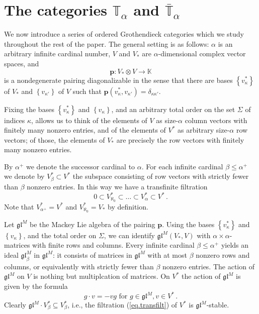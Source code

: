 \documentclass[11pt]{article}
\theoremstyle{plain}
\theoremstyle{nonumberplain}
\theoremstyle{plain}
\theoremstyle{nonumberplain}
\newcommand\bK{\mathbb K}
\newcommand\bT{\mathbb T}
\newcommand\fgl{\mathfrak{gl}}
\begin{document}
\section{The categories $\bT_\alpha$ and $\bar{\bT}_\alpha$}\label{se.ta} 



We now introduce a series of ordered Grothendieck categories which we
study throughout the rest of {the} paper. The general setting is as
follows: $\alpha$ is an arbitrary infinite cardinal number, $V$ and $V_*$ are
$\alpha$-dimensional complex vector spaces, and
\begin{equation*}
  \mathbf{p} :V_*\otimes V\to \bK
\end{equation*}
is a nondegenerate pairing diagonalizable in the sense that there are bases
$\left\{v^*_\kappa\right\}$ of $V_*$ and $\left\{v_{\kappa'}\right\}$ of $V$ such that $\mathbf{p}\left(v_\kappa^*,v_{\kappa'}\right)=\delta_{\kappa\kappa'}$.

Fixing the bases $\left\{v^*_\kappa\right\}$ and $\left\{v_\kappa\right\}$, and an arbitrary total order on the set $\Sigma$ of indices $\kappa$, allows us to think of the elements of $V$ as size-$\alpha$ column vectors with
finitely many nonzero entries, and of the {elements} of $V^*$
as arbitrary size-$\alpha$ row vectors; of those, the elements of
$V_*$ are precisely the row vectors with finitely many nonzero
entries.  

{By $\alpha^+$ we denote the successor cardinal
  to $\alpha$.}  For each infinite cardinal $\beta\le \alpha^+$ we denote by
$V^*_\beta\subset V^*$ the subspace consisting of row vectors with
strictly fewer than $\beta$ nonzero entries.   In this way we have a transfinite filtration
\begin{equation}
0\subset V^*_{\aleph_0}\subset \ldots \subset V^*_\alpha \subset V^*\,.
\label{eq.transfilt}\end{equation}
Note that $V^*_{\alpha^+}=V^*$ and $V^*_{\aleph_0}=V_*$ by definition. 

Let $\fgl^M$ be the Mackey Lie algebra of the pairing
$\mathbf{p}$.  Using the bases $\left\{v^*_\kappa\right\}$ and $\left\{v_\kappa\right\}$, and the total order on $\Sigma$, we can identify $\fgl^M(V_*,V)$ with $\alpha\times\alpha$-matrices with finite rows and columns.   Every infinite cardinal $\beta\leq\alpha^+$ yields an ideal $\fgl^M_\beta$ in $\fgl^M$: it consists of matrices  in $\fgl^M$ with at most $\beta$ nonzero rows and columns, or equivalently with strictly fewer than $\beta$ nonzero entries.  The action of $\fgl^M$ on $V$ is nothing but multiplcation of matrices.  On $V^*$ the action of $\fgl^M$ is given by the formula 
$$g\cdot v=-vg\text{ for }g\in\fgl^M, v\in V^*\,.$$
Clearly $\fgl^M\cdot V_\beta^*\subseteq V_\beta^*$, i.e., the filtration (\ref{eq.transfilt}) of $V^*$ is $\fgl^M$-stable.  %
\end{document}
